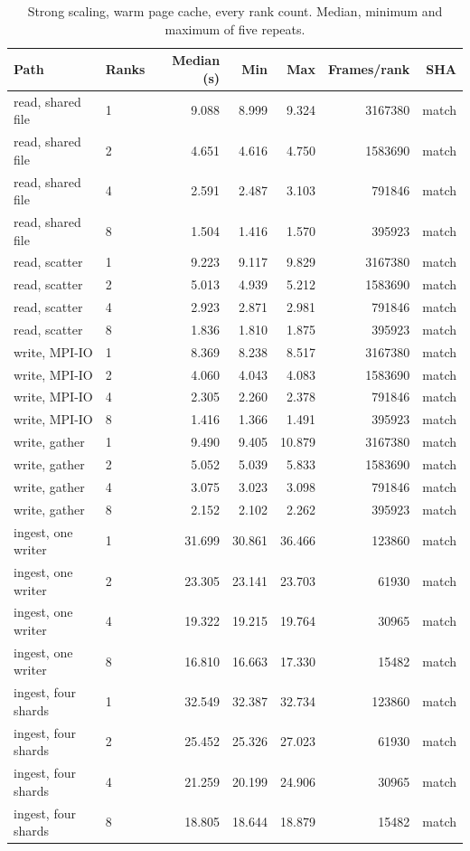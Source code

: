 \begin{table}[ht]
\centering
\scriptsize
\caption{Strong scaling, warm page cache, every rank count. Median, minimum and maximum of five repeats.}
\label{tab:mpi-strong-full}
\begin{tabular}{llrrrrr}
\toprule
Path & Ranks & Median (s) & Min & Max & Frames/rank & SHA \\
\midrule
read, shared file & 1 & 9.088 & 8.999 & 9.324 & 3167380 & match \\
read, shared file & 2 & 4.651 & 4.616 & 4.750 & 1583690 & match \\
read, shared file & 4 & 2.591 & 2.487 & 3.103 & 791846 & match \\
read, shared file & 8 & 1.504 & 1.416 & 1.570 & 395923 & match \\
read, scatter & 1 & 9.223 & 9.117 & 9.829 & 3167380 & match \\
read, scatter & 2 & 5.013 & 4.939 & 5.212 & 1583690 & match \\
read, scatter & 4 & 2.923 & 2.871 & 2.981 & 791846 & match \\
read, scatter & 8 & 1.836 & 1.810 & 1.875 & 395923 & match \\
write, MPI-IO & 1 & 8.369 & 8.238 & 8.517 & 3167380 & match \\
write, MPI-IO & 2 & 4.060 & 4.043 & 4.083 & 1583690 & match \\
write, MPI-IO & 4 & 2.305 & 2.260 & 2.378 & 791846 & match \\
write, MPI-IO & 8 & 1.416 & 1.366 & 1.491 & 395923 & match \\
write, gather & 1 & 9.490 & 9.405 & 10.879 & 3167380 & match \\
write, gather & 2 & 5.052 & 5.039 & 5.833 & 1583690 & match \\
write, gather & 4 & 3.075 & 3.023 & 3.098 & 791846 & match \\
write, gather & 8 & 2.152 & 2.102 & 2.262 & 395923 & match \\
ingest, one writer & 1 & 31.699 & 30.861 & 36.466 & 123860 & match \\
ingest, one writer & 2 & 23.305 & 23.141 & 23.703 & 61930 & match \\
ingest, one writer & 4 & 19.322 & 19.215 & 19.764 & 30965 & match \\
ingest, one writer & 8 & 16.810 & 16.663 & 17.330 & 15482 & match \\
ingest, four shards & 1 & 32.549 & 32.387 & 32.734 & 123860 & match \\
ingest, four shards & 2 & 25.452 & 25.326 & 27.023 & 61930 & match \\
ingest, four shards & 4 & 21.259 & 20.199 & 24.906 & 30965 & match \\
ingest, four shards & 8 & 18.805 & 18.644 & 18.879 & 15482 & match \\
\bottomrule
\end{tabular}
\end{table}
